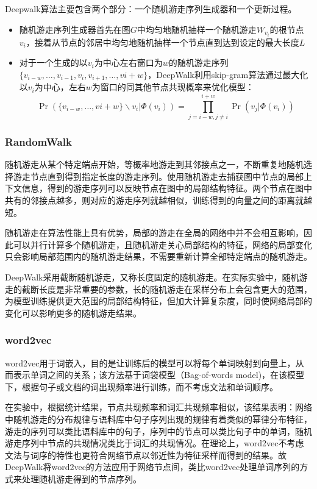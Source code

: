 \documentclass{ctexart}
\begin{document}
Deepwalk算法主要包含两个部分：一个随机游走序列生成器和一个更新过程。

\begin{itemize}
    \item 随机游走序列生成器首先在图$G$中均匀地随机抽样一个随机游走$W_{v_i}$的根节点 $v_i$，接着从节点的邻居中均匀地随机抽样一个节点直到达到设定的最大长度$L$
    \item 对于一个生成的以$v_i$为中心左右窗口为$w$的随机游走序列$\{v_{i−w},\dots,v_{i−1},v_i,v_{i+1},\dots,v{i+w}\}$，DeepWalk利用skip-gram算法通过最大化以$v_i$为中心，左右$w$为窗口的同其他节点共现概率来优化模型：$$ \Pr(\{v_{i−w},\dots,v{i+w}\}\backslash v_i| \Phi(v_i) ) = \prod_{j=i-w,j\neq i}^{i+w}\Pr(v_j|\Phi(v_i)) $$
\end{itemize}

\subsubsection{RandomWalk}

随机游走从某个特定端点开始，等概率地游走到其邻接点之一，不断重复地随机选择游走节点直到得到指定长度的游走序列。使用随机游走去捕获图中节点的局部上下文信息，得到的游走序列可以反映节点在图中的局部结构特征。两个节点在图中共有的邻接点越多，则对应的游走序列就越相似，训练得到的向量之间的距离就越短。

随机游走在算法性能上具有优势，局部的游走在全局的网络中并不会相互影响，因此可以并行计算多个随机游走，且随机游走关心局部结构的特征，网络的局部变化只会影响局部范围内的随机游走结果，不需要重新计算全部特定端点的随机游走。

DeepWalk采用截断随机游走，又称长度固定的随机游走。在实际实验中，随机游走的截断长度是非常重要的参数，长的随机游走在采样分布上会包含更大的范围，为模型训练提供更大范围的局部结构特征，但加大计算复杂度，同时使网络局部的变化可以影响更多的随机游走结果。

\subsubsection{word2vec}

word2vec用于词嵌入，目的是让训练后的模型可以将每个单词映射到向量上，从而表示单词之间的关系；该方法基于词袋模型（Bag-of-words model)，在该模型下，根据句子或文档的词出现频率进行训练，而不考虑文法和单词顺序。

在实验中，根据统计结果，节点共现频率和词汇共现频率相似，该结果表明：网络中随机游走的分布规律与语料库中句子序列出现的规律有着类似的幂律分布特征，游走的序列可以类比语料库中的句子，序列中的节点可以类比句子中的单词，随机游走序列中节点的共现情况类比于词汇的共现情况。在理论上，word2vec不考虑文法与词序的特性也更符合网络节点以邻近性为特征采样而得到的结果。故DeepWalk将word2vec的方法应用于网络节点间，类比word2vec处理单词序列的方式来处理随机游走得到的节点序列。
\end{document}
